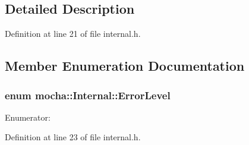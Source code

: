 \subsection{Detailed Description}


Definition at line 21 of file internal.h.



\subsection{Member Enumeration Documentation}
\hypertarget{classmocha_1_1_internal_afbba1f8f92938ca06cc3411b328995e9}{
\subsubsection[{ErrorLevel}]{\setlength{\rightskip}{0pt plus 5cm}enum {\bf mocha::Internal::ErrorLevel}}}
\label{classmocha_1_1_internal_afbba1f8f92938ca06cc3411b328995e9}
\begin{Desc}
\item[Enumerator: ]\par
\begin{description}
\item[{\em 
\hypertarget{classmocha_1_1_internal_afbba1f8f92938ca06cc3411b328995e9aed1aa64d26393f649c81a31a4df3e3f1}{
kFatal}
\label{classmocha_1_1_internal_afbba1f8f92938ca06cc3411b328995e9aed1aa64d26393f649c81a31a4df3e3f1}
}]\item[{\em 
\hypertarget{classmocha_1_1_internal_afbba1f8f92938ca06cc3411b328995e9af4ee95016bc3475b5e36686e7913cc4c}{
kNofatal}
\label{classmocha_1_1_internal_afbba1f8f92938ca06cc3411b328995e9af4ee95016bc3475b5e36686e7913cc4c}
}]\end{description}
\end{Desc}



Definition at line 23 of file internal.h.



